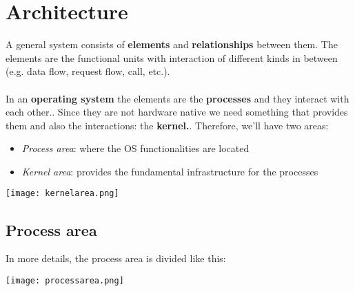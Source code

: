 \newpage
\section{Architecture}
A general system consists of  \textbf{elements} and \textbf{relationships} between them. The elements are the functional units with interaction of different kinds in between (e.g. data flow, request flow, call, etc.).\\\\
In an \textbf{operating system} the elements are the \textbf{processes} and they interact with each other.. Since they are not hardware native we need something that provides them and also the interactions: the \textbf{kernel.}. Therefore, we'll have two areas:
\begin{itemize}
	\item \textit{Process area}: where the OS functionalities are located
	\item \textit{Kernel area}: provides the fundamental infrastructure for the processes
\end{itemize}

\begin{center}
	\texttt{[image: kernelarea.png]}
\end{center}

\subsection{Process area}
In more details, the process area is divided like this:
\begin{center}
	\texttt{[image: processarea.png]}
\end{center}
